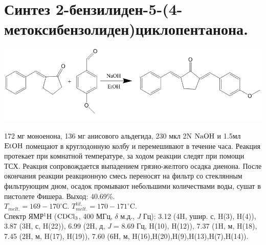 \documentclass[a4paper]{article}
\begin{document}
\section{Синтез 2-бензилиден-5-(4-метоксибензолиден)циклопентанона.}
\begin{center}
\includegraphics[scale=0.35]{pictures/2.png}
\end{center}
172 мг  моноенона, 136 мг анисового альдегида, 230 мкл 2N $\ce{NaOH}$ и 1.5мл $\ce{EtOH}$ помещают в круглодонную колбу и перемешивают в течение часа. Реакция протекает при комнатной температуре, за ходом реакции следят при помощи ТСХ. Реакция сопровождается выпадением грязно-желтого осадка диенона. После окончания реакции реакционную смесь переносят на фильтр со стеклянным фильтрующим дном, осадок промывают небольшими количествами воды, сушат в пистолете Фишера. Выход: 40.69$\%$. \\
$T_{melt.} = 169-170^{\circ}$С. $T_{melt.}^{lit.} = 170-171^{\circ}$C. \cite{rosamilia2006} \\
Спектр ЯМР$^{1}$Н ($\ce{CDCl3}$, 400 МГц, $\delta$ м.д., \textit{J} Гц): 3.12 (4H, ушир. с, H(3), H(4)), 3.87 (3H, с, H(22)), 6.99 (2H, д, \textit{J} = 8.69 Гц, H(10), H(12)), 7.37 (1H, м, H(18), 7.45 (2H, м, H(17), H(19)), 7.60 (6H, м, H(16),H(20),H(9),H(13),H(7),H(14)).
\end{document}
